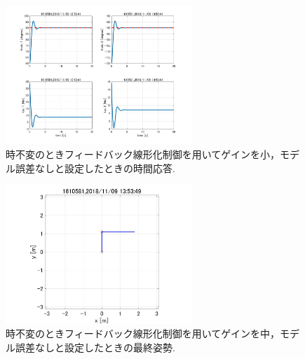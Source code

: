 \documentclass[twocolumn, 10pt,a4j]{jsarticle}
\begin{document}
    \begin{figure}[H]
      \begin{center}
        \includegraphics[width=7cm]{../img/img/kansetu_FB_zifuhen_small_no_model_gosa_zikan_auto.jpg}
        \caption{時不変のときフィードバック線形化制御を用いてゲインを小，モデル誤差なしと設定したときの時間応答.}
      \end{center}
    \end{figure}
    \begin{figure}[H]
      \begin{center}
        \includegraphics[width=7cm]{../img/img/kansetu_FB_zifuhen_chu_no_model_gosa_saisyu_sisei.jpg}
        \caption{時不変のときフィードバック線形化制御を用いてゲインを中，モデル誤差なしと設定したときの最終姿勢.}
      \end{center}
    \end{figure}
\end{document}
